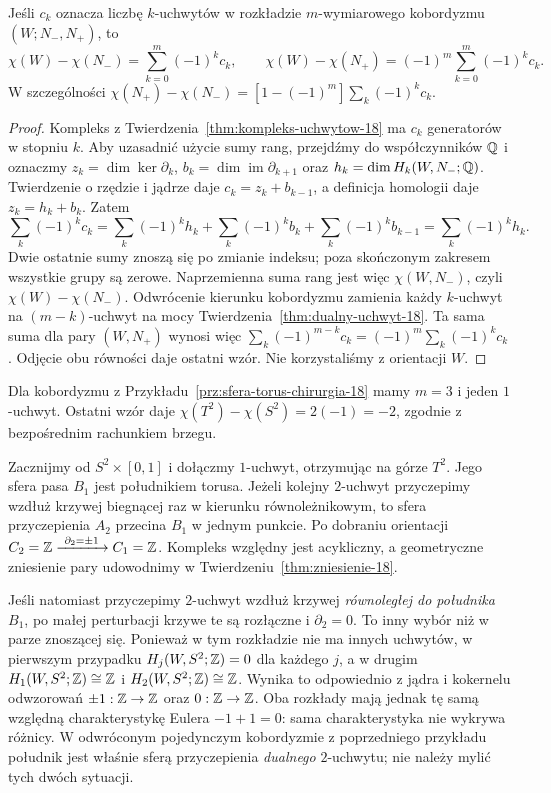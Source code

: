 \begin{stwierdzenie}
\label{prop:euler-uchwyty-23}
Jeśli $c_k$ oznacza liczbę $k$-uchwytów w rozkładzie
$m$-wymiarowego kobordyzmu $(W;N_-,N_+)$, to
\[
 \chi(W)-\chi(N_-)=\sum_{k=0}^{m}(-1)^k c_k,
 \qquad
 \chi(W)-\chi(N_+)=(-1)^m\sum_{k=0}^{m}(-1)^k c_k.
\]
W szczególności
$\chi(N_+)-\chi(N_-)
 =[1-(-1)^m]\sum_k(-1)^k c_k$.
\end{stwierdzenie}
\begin{proof}
Kompleks z Twierdzenia~\ref{thm:kompleks-uchwytow-18}
ma $c_k$ generatorów w stopniu $k$. Aby uzasadnić użycie
sumy rang, przejdźmy do współczynników $\mathbb{Q}$ i oznaczmy
$z_k=\dim\ker\partial_k$, $b_k=\dim\operatorname{im}\partial_{k+1}$
oraz $h_k=\dim H_k(W,N_-;\mathbb{Q})$. Twierdzenie o rzędzie i jądrze
daje $c_k=z_k+b_{k-1}$, a definicja homologii daje
$z_k=h_k+b_k$. Zatem
\[
 \sum_k(-1)^k c_k
 =\sum_k(-1)^k h_k
   +\sum_k(-1)^k b_k+\sum_k(-1)^k b_{k-1}
 =\sum_k(-1)^k h_k.
\]
Dwie ostatnie sumy znoszą się po zmianie indeksu;
poza skończonym zakresem wszystkie grupy są zerowe.
Naprzemienna suma rang jest więc $\chi(W,N_-)$,
czyli $\chi(W)-\chi(N_-)$. Odwrócenie kierunku
kobordyzmu zamienia każdy $k$-uchwyt na
$(m-k)$-uchwyt na mocy
Twierdzenia~\ref{thm:dualny-uchwyt-18}.
Ta sama suma dla pary $(W,N_+)$ wynosi więc
$\sum_k(-1)^{m-k}c_k=(-1)^m\sum_k(-1)^k c_k$.
Odjęcie obu równości daje ostatni wzór.
Nie korzystaliśmy z orientacji $W$.
\end{proof}

Dla kobordyzmu z Przykładu~\ref{prz:sfera-torus-chirurgia-18}
mamy $m=3$ i jeden $1$-uchwyt. Ostatni wzór daje
$\chi(T^2)-\chi(S^2)=2(-1)=-2$, zgodnie z
bezpośrednim rachunkiem brzegu.

\begin{przyklad}
\label{prz:meridian-longitude-18}
Zacznijmy od $S^2\times[0,1]$ i
dołączmy $1$-uchwyt, otrzymując na górze $T^2$.
Jego sfera pasa $B_1$ jest południkiem
torusa. Jeżeli kolejny $2$-uchwyt przyczepimy
wzdłuż krzywej biegnącej raz w kierunku
równoleżnikowym, to sfera przyczepienia
$A_2$ przecina $B_1$ w jednym punkcie.
Po dobraniu orientacji
$C_2=\mathbb{Z}\xrightarrow{\ \partial_2=\pm1\ }
 C_1=\mathbb{Z}$.
Kompleks względny jest acykliczny,
a geometryczne zniesienie pary
udowodnimy w
Twierdzeniu~\ref{thm:zniesienie-18}.

Jeśli natomiast przyczepimy $2$-uchwyt
wzdłuż krzywej \emph{równoległej do
południka} $B_1$, po małej perturbacji
krzywe te są rozłączne i $\partial_2=0$.
To inny wybór niż w parze znoszącej się.
Ponieważ w tym rozkładzie nie ma innych uchwytów,
w pierwszym przypadku $H_j(W,S^2;\mathbb{Z})=0$ dla każdego $j$,
a w drugim $H_1(W,S^2;\mathbb{Z})\cong\mathbb{Z}$ i
$H_2(W,S^2;\mathbb{Z})\cong\mathbb{Z}$. Wynika to odpowiednio z jądra
i kokernelu odwzorowań $\pm1:\mathbb{Z}\to\mathbb{Z}$ oraz $0:\mathbb{Z}\to\mathbb{Z}$.
Oba rozkłady mają jednak tę samą względną charakterystykę
Eulera $-1+1=0$: sama charakterystyka nie wykrywa różnicy.
W odwróconym pojedynczym kobordyzmie
z poprzedniego przykładu południk
jest właśnie sferą przyczepienia
\emph{dualnego} $2$-uchwytu;
nie należy mylić tych dwóch sytuacji.
\end{przyklad}

